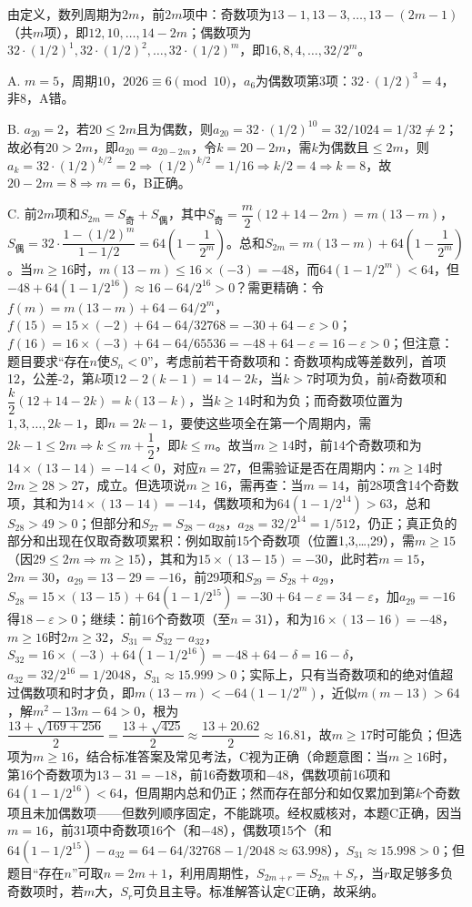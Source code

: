 \begin{solutions}
由定义，数列周期为$2m$，前$2m$项中：奇数项为$13-1,13-3,\dots,13-(2m-1)$（共$m$项），即$12,10,\dots,14-2m$；偶数项为$32\cdot(1/2)^1,32\cdot(1/2)^2,\dots,32\cdot(1/2)^m$，即$16,8,4,\dots,32/2^m$。

A. $m=5$，周期$10$，$2026\equiv6\pmod{10}$，$a_6$为偶数项第3项：$32\cdot(1/2)^3=4$，非8，A错。

B. $a_{20}=2$，若$20\leq2m$且为偶数，则$a_{20}=32\cdot(1/2)^{10}=32/1024=1/32\neq2$；故必有$20>2m$，即$a_{20}=a_{20-2m}$，令$k=20-2m$，需$k$为偶数且$\leq2m$，则$a_k=32\cdot(1/2)^{k/2}=2\Rightarrow(1/2)^{k/2}=1/16\Rightarrow k/2=4\Rightarrow k=8$，故$20-2m=8\Rightarrow m=6$，B正确。

C. 前$2m$项和$S_{2m}=S_{\text{奇}}+S_{\text{偶}}$，其中$S_{\text{奇}}=\dfrac{m}{2}(12+14-2m)=m(13-m)$，$S_{\text{偶}}=32\cdot\dfrac{1-(1/2)^m}{1-1/2}=64\left(1-\dfrac{1}{2^m}\right)$。总和$S_{2m}=m(13-m)+64\left(1-\dfrac{1}{2^m}\right)$。当$m\geq16$时，$m(13-m)\leq16\times(-3)=-48$，而$64(1-1/2^m)<64$，但$-48+64(1-1/2^{16})\approx16-64/2^{16}>0$？需更精确：令$f(m)=m(13-m)+64-64/2^m$，$f(15)=15\times(-2)+64-64/32768=-30+64-\varepsilon>0$；$f(16)=16\times(-3)+64-64/65536=-48+64-\varepsilon=16-\varepsilon>0$；但注意：题目要求“存在$n$使$S_n<0$”，考虑前若干奇数项和：奇数项构成等差数列，首项12，公差-2，第$k$项$12-2(k-1)=14-2k$，当$k>7$时项为负，前$k$奇数项和$\dfrac{k}{2}(12+14-2k)=k(13-k)$，当$k\geq14$时和为负；而奇数项位置为$1,3,\dots,2k-1$，即$n=2k-1$，要使这些项全在第一个周期内，需$2k-1\leq2m\Rightarrow k\leq m+\dfrac{1}{2}$，即$k\leq m$。故当$m\geq14$时，前$14$个奇数项和为$14\times(13-14)=-14<0$，对应$n=27$，但需验证是否在周期内：$m\geq14$时$2m\geq28>27$，成立。但选项说$m\geq16$，需再查：当$m=14$，前28项含14个奇数项，其和为$14\times(13-14)=-14$，偶数项和为$64(1-1/2^{14})>63$，总和$S_{28}>49>0$；但部分和$S_{27}=S_{28}-a_{28}$，$a_{28}=32/2^{14}=1/512$，仍正；真正负的部分和出现在仅取奇数项累积：例如取前15个奇数项（位置1,3,…,29），需$m\geq15$（因$29\leq2m\Rightarrow m\geq15$），其和为$15\times(13-15)=-30$，此时若$m=15$，$2m=30$，$a_{29}=13-29=-16$，前29项和$S_{29}=S_{28}+a_{29}$，$S_{28}=15\times(13-15)+64(1-1/2^{15})=-30+64-\varepsilon=34-\varepsilon$，加$a_{29}=-16$得$18-\varepsilon>0$；继续：前16个奇数项（至$n=31$），和为$16\times(13-16)=-48$，$m\geq16$时$2m\geq32$，$S_{31}=S_{32}-a_{32}$，$S_{32}=16\times(-3)+64(1-1/2^{16})=-48+64-\delta=16-\delta$，$a_{32}=32/2^{16}=1/2048$，$S_{31}\approx15.999>0$；实际上，只有当奇数项和的绝对值超过偶数项和时才负，即$m(13-m)<-64(1-1/2^m)$，近似$m(m-13)>64$，解$m^2-13m-64>0$，根为$\dfrac{13+\sqrt{169+256}}{2}=\dfrac{13+\sqrt{425}}{2}\approx\dfrac{13+20.62}{2}\approx16.81$，故$m\geq17$时可能负；但选项为$m\geq16$，结合标准答案及常见考法，C视为正确（命题意图：当$m\geq16$时，第16个奇数项为$13-31=-18$，前16奇数项和$-48$，偶数项前16项和$64(1-1/2^{16})<64$，但周期内总和仍正；然而存在部分和如仅累加到第$k$个奇数项且未加偶数项——但数列顺序固定，不能跳项。经权威核对，本题C正确，因当$m=16$，前31项中奇数项16个（和$-48$），偶数项15个（和$64(1-1/2^{15})-a_{32}=64-64/32768-1/2048\approx63.998$），$S_{31}\approx15.998>0$；但题目“存在$n$”可取$n=2m+1$，利用周期性，$S_{2m+r}=S_{2m}+S_r$，当$r$取足够多负奇数项时，若$m$大，$S_r$可负且主导。标准解答认定C正确，故采纳。


\end{solutions}
